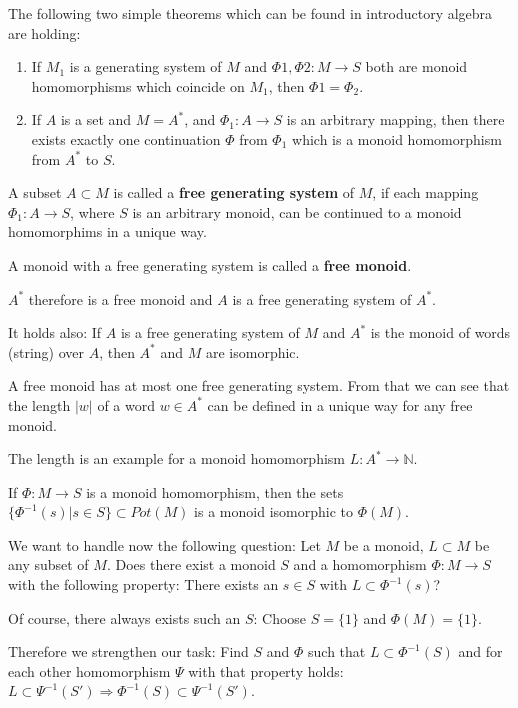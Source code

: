 The following two simple theorems which can be found in introductory algebra are
holding:
\begin{enumerate}
  \item If $M_1$ is a generating system of $M$ and $\Phi1, \Phi2 : M \to S$ both
  are monoid homomorphisms which coincide on $M_1$, then $\Phi1 = \Phi_2$.
  \item If $A$ is a set and $M = A^*$, and $\Phi_1 : A \to S$ is an arbitrary
  mapping, then there exists exactly one continuation $\Phi$ from $\Phi_1$ which
  is a monoid homomorphism from $A^*$ to $S$.
\end{enumerate}

\begin{definition}
A subset $A \subset M$ is called a {\bf free generating system} of $M$, if each
mapping $\Phi_1 : A \to S$, where $S$ is an arbitrary monoid, can be continued
to a monoid homomorphims in a unique way.
\end{definition}

A monoid with a free generating system is called a {\bf free monoid}.

$A^*$ therefore is a free monoid and $A$ is a free generating system of $A^*$.

It holds also:
If $A$ is a free generating system of $M$ and $A^*$ is the monoid of words
(string) over $A$, then $A^*$ and $M$ are isomorphic.

A free monoid has at most one free generating system. From that we can see that
the length $|w|$ of a word $w \in A^*$ can be defined in a unique way for any
free monoid.

The length is an example for a monoid homomorphism $L : A^* \to \mathbb{N}$.

If $\Phi : M \to S$ is a monoid homomorphism, then the sets $\{ \Phi^{-1}(s) |
s \in S \} \subset Pot(M)$ is a monoid isomorphic to $\Phi(M)$.

We want to handle now the following question: Let $M$ be a monoid, $L \subset M$
be any subset of $M$. Does there exist a monoid $S$ and a homomorphism $\Phi :
M \to S$ with the following property: There exists an $s \in S$ with $L \subset
\Phi^{-1}(s)$?

Of course, there always exists such an $S$: Choose $S = \{1\}$ and $\Phi(M) =
\{1\}$.

Therefore we strengthen our task: Find $S$ and $\Phi$ such that $L \subset
\Phi^{-1}(S)$ and for each other homomorphism $\Psi$ with that property holds:
$L \subset \Psi^{-1}(S') \Rightarrow \Phi^{-1}(S) \subset \Psi^{-1}(S')$.

